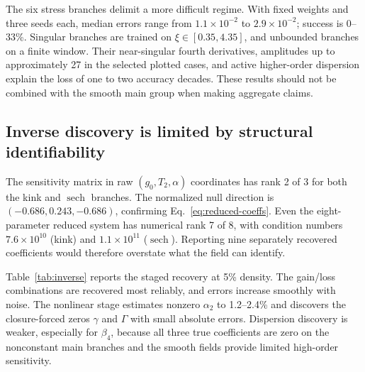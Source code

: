 \documentclass[11pt]{article}
\newcommand{\sech}{\operatorname{sech}}
\begin{document}
The six stress branches delimit a more difficult regime.  With fixed weights
and three seeds each, median errors range from $1.1\times10^{-2}$ to
$2.9\times10^{-2}$; success is 0--33\%.  Singular branches are trained on
$\xi\in[0.35,4.35]$, and unbounded branches on a finite window.  Their
near-singular fourth derivatives, amplitudes up to approximately 27 in the
selected plotted cases, and active higher-order dispersion explain the loss
of one to two accuracy decades.  These results should not be combined with the
smooth main group when making aggregate claims.

\subsection{Inverse discovery is limited by structural identifiability}

The sensitivity matrix in raw $(g_0,T_2,\alpha)$ coordinates has rank 2 of 3
for both the kink and $\sech$ branches.  The normalized null direction is
$(-0.686,0.243,-0.686)$, confirming Eq.~\eqref{eq:reduced-coeffs}.  Even the
eight-parameter reduced system has numerical rank 7 of 8, with condition
numbers $7.6\times10^{10}$ (kink) and $1.1\times10^{11}$ ($\sech$).  Reporting
nine separately recovered coefficients would therefore overstate what the
field can identify.

Table~\ref{tab:inverse} reports the staged recovery at 5\% density.  The
gain/loss combinations are recovered most reliably, and errors increase
smoothly with noise.  The nonlinear stage estimates nonzero $\alpha_2$ to
1.2--2.4\% and discovers the closure-forced zeros $\gamma$ and $\Gamma$ with
small absolute errors.  Dispersion discovery is weaker, especially for
$\beta_4$, because all three true coefficients are zero on the nonconstant
main branches and the smooth fields provide limited high-order sensitivity.
\end{document}
